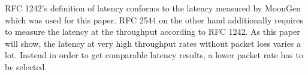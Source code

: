 
RFC 1242's definition of latency conforms to the latency measured by
MoonGen which was used for this paper. RFC 2544 on the other hand
additionally requires to measure the latency at the throughput
according to RFC 1242. As this paper will show, the latency at very
high throughput rates without packet loss varies a lot. Instead in
order to get comparable latency results, a lower packet rate has to be
selected.


